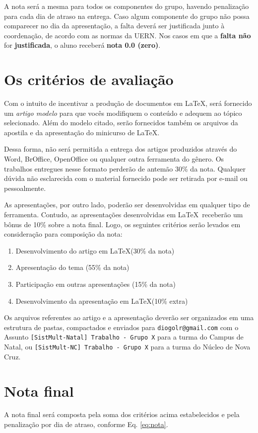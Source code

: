 \documentclass[a4paper,11pt]{article}
\begin{document}
A nota será a mesma para todos os componentes do grupo, havendo penalização para
cada dia de atraso na entrega. Caso algum componente do grupo não possa
comparecer no dia da apresentação, a falta deverá ser justificada junto à
coordenação, de acordo com as normas da UERN. Nos casos em que a {\bf falta não}
for {\bf justificada}, o aluno receberá {\bf nota 0.0 (zero)}.

\section*{Os critérios de avaliação}
Com o intuito de incentivar a produção de documentos em \LaTeX, será fornecido
um {\it artigo modelo} para que vocês modifiquem o conteúdo e adequem ao tópico
selecionado. Além do modelo citado, serão fornecidos também os arquivos da
apostila e da apresentação do minicurso de \LaTeX. 

Dessa forma, não será permitida a entrega dos artigos produzidos através do
Word, BrOffice, OpenOffice ou qualquer outra ferramenta do gênero. Os trabalhos
entregues nesse formato perderão de antemão 30\% da nota. Qualquer dúvida não
esclarecida com o material fornecido pode ser retirada por e-mail ou
pessoalmente.

As apresentações, por outro lado, poderão ser desenvolvidas em qualquer tipo de
ferramenta. Contudo, as apresentações desenvolvidas em \LaTeX\ receberão um
bônus de 10\% sobre a nota final. Logo, os seguintes critérios serão levados em
consideração para composição da nota:

\begin{enumerate}
    \item Desenvolvimento do artigo em \LaTeX (30\% da nota)
    \item Apresentação do tema (55\% da nota)
    \item Participação em outras apresentações (15\% da nota)
    \item Desenvolvimento da apresentação em \LaTeX (10\% extra)
\end{enumerate}

Os arquivos referentes ao artigo e a apresentação deverão ser organizados em uma
estrutura de pastas, compactados e enviados para {\tt diogolr@gmail.com} com o
Assunto {\tt [SistMult-Natal] Trabalho - Grupo X} para a turma do Campus de
Natal, ou {\tt [SistMult-NC] Trabalho - Grupo X} para a turma do Núcleo de Nova
Cruz.

\section*{Nota final}
A nota final será composta pela soma dos critérios acima estabelecidos e pela
penalização por dia de atraso, conforme Eq. \ref{eq:nota}.
\end{document}
